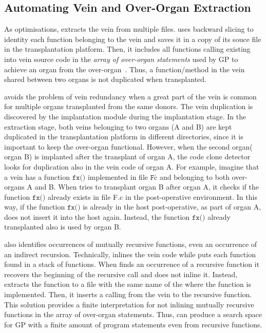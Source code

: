 \subsection{Automating Vein and Over-Organ Extraction}
As optimisations, \prodscalpel extracts the vein from multiple files. \prodscalpel uses backward slicing to identity each function belonging to the vein and saves it in a copy of its souce file in the transplantation platform. Then, it includes all functions calling existing into vein source code in the \emph{array of over-organ statements} used by GP to achieve an organ from the over-organ~\cite{Barr2015}. Thus,  a function/method in the vein shared between two organs is not duplicated when transplanted.

\prodscalpel avoids the problem of vein redundancy when a great part of the vein is common for multiple organs transplanted from the same donors. The vein duplication is discovered by the implantation module during the implantation stage. In the extraction stage, both veins belonging to two organs (A and B) are kept duplicated in the transplantation platform in different directories, since it is important to keep the over-organ functional. However, when the second organ( organ B) is implanted after the transplant of organ A, the code clone detector looks for duplication also in the vein code of organ A. For example, imagine that a vein has a function $\texttt{fx()}$ implemented in file $\texttt{F\.c}$ and belonging to both over-organs A and B. When \prodscalpel tries to transplant organ B after organ A, it checks if the function  $\texttt{fx()}$ already exists in file F.c in the post-operative environment. In this way, if the function  $\texttt{fx()}$ is already in the host post-operative, as part of organ A, \prodscalpel does not insert it into the host again. Instead, the function $\texttt{fx()}$ already transplanted also is used by organ B.

\prodscalpel also identifies occurrences of mutually recursive functions, even an occurrence of an indirect recursion. Technically, \prodscalpel inlines the vein code while puts each function found in a stack of functions. When \prodscalpel finds an occurrence of a recursive function it recovers the beginning of the recursive call and does not inline it. Instead, \prodscalpel extracts the function to a file with the same name of the where the function is implemented. Then, it inserts a calling from the vein to the recursive function. This solution provides a finite interpretation for not inlining mutually recursive functions in the array of over-organ statements. Thus, \prodscalpel can produce a search space for GP with a finite amount of program statements even from recursive functions.

